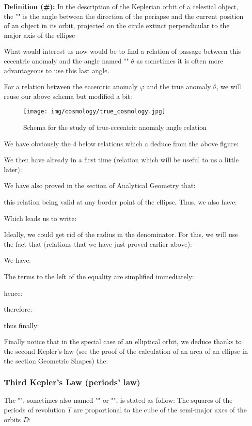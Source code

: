 	\textbf{Definition (\#\mydef):} In the description of the Keplerian orbit of a celestial object, the "" is the angle between the direction of the periapse and the current position of an object in its orbit, projected on the circle extinct perpendicular to the major axis of the ellipse

	What would interest us now would be to find a relation of passage between this eccentric anomaly and the angle named "" $\theta$ as sometimes it is often more advantageous to use this last angle.

	For a relation between the eccentric anomaly $\varphi$ and the true anomaly $\theta$, we will reuse our above schema but modified a bit:
	\begin{figure}[H]
		\begin{center}
		\texttt{[image: img/cosmology/true\_cosmology.jpg]}
		\end{center}	
		\caption{Schema for the study of true-eccentric anomaly angle relation}
	\end{figure}
	We have obviously the $4$ below relations which a deduce from the above figure:
	
	We then have already in a first time (relation which will be useful to us a little later):
	
 	We have also proved in the section of Analytical Geometry that:
	
	this relation being valid at any border point of the ellipse. Thus, we also have:
	
 	Which leads us to write:
	
	Ideally, we could get rid of the radius in the denominator. For this, we will use the fact that (relations that we have just proved earlier above):
	
	We have:
	
 	The terms to the left of the equality are simplified immediately:
	
	hence:
	
 	therefore:
	
	thus finally:
	
	Finally notice that in the special case of an elliptical orbit, we deduce thanks to the second Kepler's law (see the proof of the calculation of an area of an ellipse in the section Geometric Shapes) the:
	
	\pagebreak
	\subsubsection{Third Kepler's Law (periods' law)}\label{third kepler law}
	The "", sometimes also named  "" or "", is stated as follow: The squares of the periods of revolution $T$ are proportional to the cube of the semi-major axes of the orbits $D$:
	
